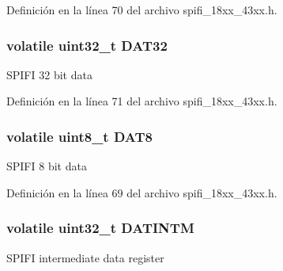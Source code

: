 Definición en la línea 70 del archivo spifi\+\_\+18xx\+\_\+43xx.\+h.

\subsubsection[{\texorpdfstring{D\+A\+T32}{DAT32}}]{\setlength{\rightskip}{0pt plus 5cm}volatile uint32\+\_\+t D\+A\+T32}\hypertarget{struct_l_p_c___s_p_i_f_i___c_h_i_p_h_w_a47d3b0caad175a985ddcaff5b9189214}{}\label{struct_l_p_c___s_p_i_f_i___c_h_i_p_h_w_a47d3b0caad175a985ddcaff5b9189214}
S\+P\+I\+FI 32 bit data 

Definición en la línea 71 del archivo spifi\+\_\+18xx\+\_\+43xx.\+h.

\subsubsection[{\texorpdfstring{D\+A\+T8}{DAT8}}]{\setlength{\rightskip}{0pt plus 5cm}volatile uint8\+\_\+t D\+A\+T8}\hypertarget{struct_l_p_c___s_p_i_f_i___c_h_i_p_h_w_ada5a1d7176cbf6c6428cc74bb5e3e4c5}{}\label{struct_l_p_c___s_p_i_f_i___c_h_i_p_h_w_ada5a1d7176cbf6c6428cc74bb5e3e4c5}
S\+P\+I\+FI 8 bit data 

Definición en la línea 69 del archivo spifi\+\_\+18xx\+\_\+43xx.\+h.

\subsubsection[{\texorpdfstring{D\+A\+T\+I\+N\+TM}{DATINTM}}]{\setlength{\rightskip}{0pt plus 5cm}volatile uint32\+\_\+t D\+A\+T\+I\+N\+TM}\hypertarget{struct_l_p_c___s_p_i_f_i___c_h_i_p_h_w_a614fb7760bd8116f2e4e1f768d0863cb}{}\label{struct_l_p_c___s_p_i_f_i___c_h_i_p_h_w_a614fb7760bd8116f2e4e1f768d0863cb}
S\+P\+I\+FI intermediate data register 

